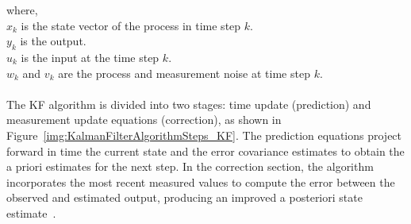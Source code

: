 where,\\
$x_k$ is the state vector of the process in time step $k$.\\
$y_k$ is the output.\\
$u_k$ is the input at the time step $k$.\\
$w_k$ and $v_k$ are the process and measurement noise at time step $k$.
\\
\\
The \acs{KF} algorithm is divided into two stages: time update (prediction) and measurement update equations (correction),
as shown in Figure~\ref{img:KalmanFilterAlgorithmSteps_KF}. 
The prediction equations project forward in time the current state and the error covariance estimates to obtain the a priori
estimates for the next step. In the correction section, the algorithm incorporates the most recent measured values to compute 
the error between the observed and estimated output, producing an improved a posteriori state estimate~\cite{welch1995}.
\\

